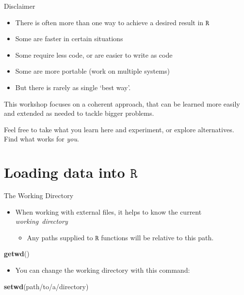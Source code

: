 \documentclass[
  11pt,
  ignorenonframetext,
]{beamer}
\newenvironment{Shaded}{\begin{snugshade}}{\end{snugshade}}
\newcommand{\FunctionTok}[1]{\textcolor[rgb]{0.13,0.29,0.53}{\textbf{#1}}}
\newcommand{\NormalTok}[1]{#1}
\newcommand{\StringTok}[1]{\textcolor[rgb]{0.31,0.60,0.02}{#1}}
\providecommand{\tightlist}{%
  \setlength{\itemsep}{0pt}\setlength{\parskip}{0pt}}
\newcommand{\R}{\texttt{R}}
\begin{document}
\begin{frame}{Disclaimer}
\protect\hypertarget{disclaimer}{}
\begin{itemize}
\item
  There is often more than one way to achieve a desired result in \(\R\)
\item
  Some are faster in certain situations
\item
  Some require less code, or are easier to write as code
\item
  Some are more portable (work on multiple systems)
\item
  But there is rarely as single `best way'.
\end{itemize}

This workshop focuses on a coherent approach, that can be learned more
easily and extended as needed to tackle bigger problems.

Feel free to take what you learn here and experiment, or explore
alternatives. Find what works for \emph{you}.
\end{frame}

\hypertarget{loading-data-into-r}{%
\section{\texorpdfstring{Loading data into
\(\R\)}{Loading data into \textbackslash R}}\label{loading-data-into-r}}

\begin{frame}[fragile]{The Working Directory}
\protect\hypertarget{the-working-directory}{}
\begin{itemize}
\tightlist
\item
  When working with external files, it helps to know the current
  \emph{working~directory}

  \begin{itemize}
  \tightlist
  \item
    Any paths supplied to \(\R\) functions will be relative to this
    path.
  \end{itemize}
\end{itemize}

\begin{Shaded}
\begin{Highlighting}[]
\FunctionTok{getwd}\NormalTok{()}
\end{Highlighting}
\end{Shaded}

\begin{itemize}
\tightlist
\item
  You can change the working directory with this command:
\end{itemize}

\begin{Shaded}
\begin{Highlighting}[]
\FunctionTok{setwd}\NormalTok{(}\StringTok{\textquotesingle{}path/to/a/directory\textquotesingle{}}\NormalTok{)}
\end{Highlighting}
\end{Shaded}
\end{frame}
\end{document}
